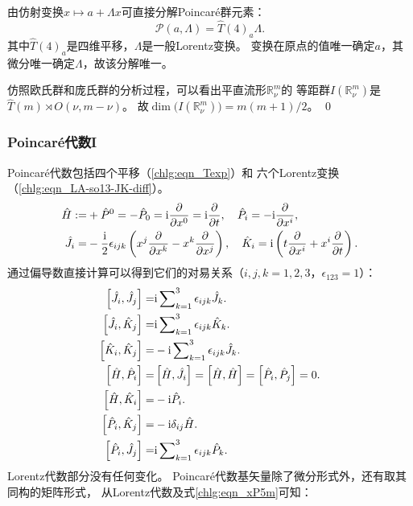 由仿射变换$x\mapsto a+\Lambda x$可直接分解Poincar\'{e}群元素：
\begin{equation}
    \mathcal{P}(a,\Lambda)= \hat{T}(4)_{a} \Lambda .
\end{equation}
其中$\hat{T}(4)_{a}$是四维平移，$\Lambda$是一般Lorentz变换。
变换在原点的值唯一确定$a$，其微分唯一确定$\Lambda$，故该分解唯一。

\begin{example}\label{chlg:exm_Rmnu}
    仿照欧氏群和庞氏群的分析过程，可以看出平直流形$\mathbb{R}^m_\nu$的
    等距群$I(\mathbb{R}^m_\nu)$是$\hat{T}(m)\rtimes O(\nu,m-\nu)$。
    故$\dim \bigl(I(\mathbb{R}^m_\nu)\bigr)= m(m+1)/2 $。    \qed
\end{example}

\subsubsection{Poincar\'{e}代数I}
Poincar\'{e}代数包括四个平移（\eqref{chlg:eqn_Texp}）和
六个Lorentz变换（\eqref{chlg:eqn_LA-so13-JK-diff}）。
\begin{subequations}\label{chlg:eqn_PA-gen}
    \begin{align}
        \hat{H} := & +\hat{P}^0= -\hat{P}_0 = \mathrm{i} \frac{\partial }{\partial x^0}
        = \mathrm{i} \frac{\partial }{\partial t }, \quad
        \hat{P}_i = -\mathrm{i} \frac{\partial }{\partial x^i} ,\\
        \hat{J}_i=& -\frac{\mathrm{i} }{2}\epsilon_{ijk} \left(x^j\frac{\partial }{\partial x^k}
        - x^k\frac{\partial }{\partial x^j}\right), \quad
        \hat{K}_i= \mathrm{i} \left(t\frac{\partial }{\partial x^i}+  x^i\frac{\partial }{\partial t}\right) .
    \end{align}
\end{subequations}
通过偏导数直接计算可以得到它们的对易关系（$i,j,k=1,2,3$，$\epsilon_{123}=1$）：
\begin{subequations}\label{chlg:eqn_PA-iso13-comm-PJK}
    \begin{align}
        \left[\hat{J}_i, \hat{J}_j \right] =& \mathrm{i} \sum\nolimits_{k=1}^{3} \epsilon_{ijk} \hat{J}_k . \\
        \left[\hat{J}_i, \hat{K}_j\right] =& \mathrm{i} \sum\nolimits_{k=1}^{3} \epsilon_{ijk} \hat{K}_k . \\
        \left[\hat{K}_i, \hat{K}_j\right] =& -\mathrm{i} \sum\nolimits_{k=1}^{3} \epsilon_{ijk} \hat{J}_k . \\
        \left[\hat{H}, \hat{P}_i \right] =& \left[\hat{H}, \hat{J}_i \right]
        =\left[\hat{H}, \hat{H} \right] =\left[\hat{P}_i, \hat{P}_j \right] =0 . \\
        \left[\hat{H}, \hat{K}_i \right] = & -\mathrm{i} \hat{P}_i .\\
        \left[\hat{P}_i, \hat{K}_j \right] =& -\mathrm{i} \delta_{ij} \hat{H} . \\
        \left[\hat{P}_i, \hat{J}_j \right] =& \mathrm{i} \sum\nolimits_{k=1}^{3} \epsilon_{ijk} \hat{P}_k .
    \end{align}
\end{subequations}
Lorentz代数部分没有任何变化。
Poincar\'{e}代数基矢量除了微分形式外，还有取其同构的矩阵形式，
从Lorentz代数及式\eqref{chlg:eqn_xP5m}可知：

